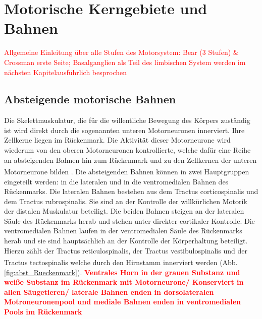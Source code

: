 \documentclass[12pt,a4paper,pdftex]{article}
\begin{document}
\newpage
\section{Motorische Kerngebiete und Bahnen}
\textcolor{red}{Allgemeine Einleitung über alle Stufen des Motorsystem: Bear (3 Stufen) \&  Crossman erste Seite; Basalganglien als Teil des limbischen System werden im nächsten Kapitelausführlich besprochen}

\subsection{Absteigende motorische Bahnen}
Die Skelettmuskulatur, die für die willentliche Bewegung des Körpers zuständig ist wird direkt durch die sogenannten unteren Motorneuronen innerviert. Ihre Zellkerne liegen im Rückenmark. Die Aktivität dieser Motorneurone wird wiederum von den oberen Motorneuronen kontrollierte, welche dafür eine Reihe an absteigenden Bahnen hin zum Rückenmark und zu den Zellkernen der unteren Motorneurone bilden \textsuperscript{\cite[1]{crossman2014neuroanatomy}}. Die absteigenden Bahnen können in zwei Hauptgruppen eingeteilt werden: in die lateralen und in die ventromedialen Bahnen des Rückenmarks. Die lateralen Bahnen bestehen aus dem Tractus corticospinalis und dem Tractus rubrospinalis. Sie sind an der Kontrolle der willkürlichen Motorik der distalen Muskulatur beteiligt. Die beiden Bahnen steigen an der lateralen Säule des Rückenmarks herab und stehen unter direkter cortikaler Kontrolle. Die ventromedialen Bahnen laufen in der ventromedialen Säule des Rückenmarks herab und sie sind hauptsächlich an der Kontrolle der Körperhaltung beteiligt. Hierzu zählt der Tractus reticulospinalis, der Tractus vestibulospinalis und der Tractus tectospinalis welche durch den Hirnstamm innerviert werden \textsuperscript{\cite[14]{neurowissenschaften_baer}} (Abb. \ref{fig:abst_Rueckenmark}).  
\textcolor{red}{\textbf{Ventrales Horn in der grauen Substanz und weiße Substanz im Rückenmark mit Motorneurone/ Konserviert in allen Säugetieren/ laterale Bahnen enden in dorsolateralen Motroneuronenpool und mediale Bahnen enden in ventromedialen Pools im Rückenmark}}
\end{document}
